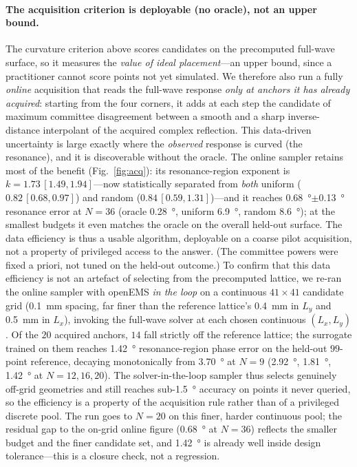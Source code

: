 \documentclass[11pt]{article}
\begin{document}
\paragraph{The acquisition criterion is deployable (no oracle), not an upper bound.} The curvature criterion above scores
candidates on the precomputed full-wave surface, so it measures the \emph{value of ideal placement}---an
upper bound, since a practitioner cannot score points not yet simulated. We therefore also run a fully
\emph{online} acquisition that reads the full-wave response \emph{only at anchors it has already
acquired}: starting from the four corners, it adds at each step the candidate of maximum committee
disagreement between a smooth and a sharp inverse-distance interpolant of the acquired complex
reflection. This data-driven uncertainty is large exactly where the \emph{observed} response is curved
(the resonance), and it is discoverable without the oracle. The online sampler retains most of the benefit
(Fig.~\ref{fig:acq}): its resonance-region exponent is $k\!=\!1.73\,[1.49,1.94]$---now statistically
separated from \emph{both} uniform ($0.82\,[0.68,0.97]$) and random ($0.84\,[0.59,1.31]$)---and it reaches
\SI{0.68}{\degree}$\pm$\SI{0.13}{\degree} resonance error at $N\!=\!36$ (oracle \SI{0.28}{\degree}, uniform
\SI{6.9}{\degree}, random \SI{8.6}{\degree}); at the smallest budgets it even matches the oracle on the
overall held-out surface. The data efficiency is thus a usable algorithm, deployable on a coarse pilot
acquisition, not a property of privileged access to the answer. (The committee powers were fixed a priori,
not tuned on the held-out outcome.) To confirm that this data efficiency is not an artefact of
selecting from the precomputed lattice, we re-ran the online sampler with openEMS \emph{in the loop} on a
continuous $41\times41$ candidate grid (\SI{0.1}{\milli\metre} spacing, far finer than the reference
lattice's \SI{0.4}{\milli\metre} in $L_y$ and \SI{0.5}{\milli\metre} in $L_x$), invoking the full-wave solver at each chosen continuous
$(L_x,L_y)$. Of the $20$ acquired anchors, $14$ fall strictly off the reference lattice; the surrogate
trained on them reaches \SI{1.42}{\degree} resonance-region phase error on the held-out $99$-point reference,
decaying monotonically from \SI{3.70}{\degree} at $N\!=\!9$ (\SI{2.92}{\degree}, \SI{1.81}{\degree},
\SI{1.42}{\degree} at $N\!=\!12,16,20$). The solver-in-the-loop sampler thus selects genuinely off-grid
geometries and still reaches sub-\SI{1.5}{\degree} accuracy on points it never queried, so the efficiency is
a property of the acquisition rule rather than of a privileged discrete pool. The run goes to $N\!=\!20$
on this finer, harder continuous pool; the residual gap to the on-grid online figure (\SI{0.68}{\degree} at
$N\!=\!36$) reflects the smaller budget and the finer candidate set, and \SI{1.42}{\degree} is already well
inside design tolerance---this is a closure check, not a regression.
\end{document}
